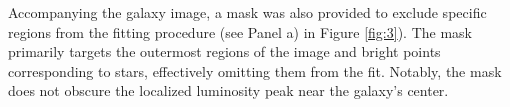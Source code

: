



Accompanying the galaxy image, a mask was also provided to exclude specific regions from the fitting procedure (see Panel a) in Figure \ref{fig:3}). The mask primarily targets the outermost regions of the image and bright points corresponding to stars, effectively omitting them from the fit. Notably, the mask does not obscure the localized luminosity peak near the galaxy's center.

